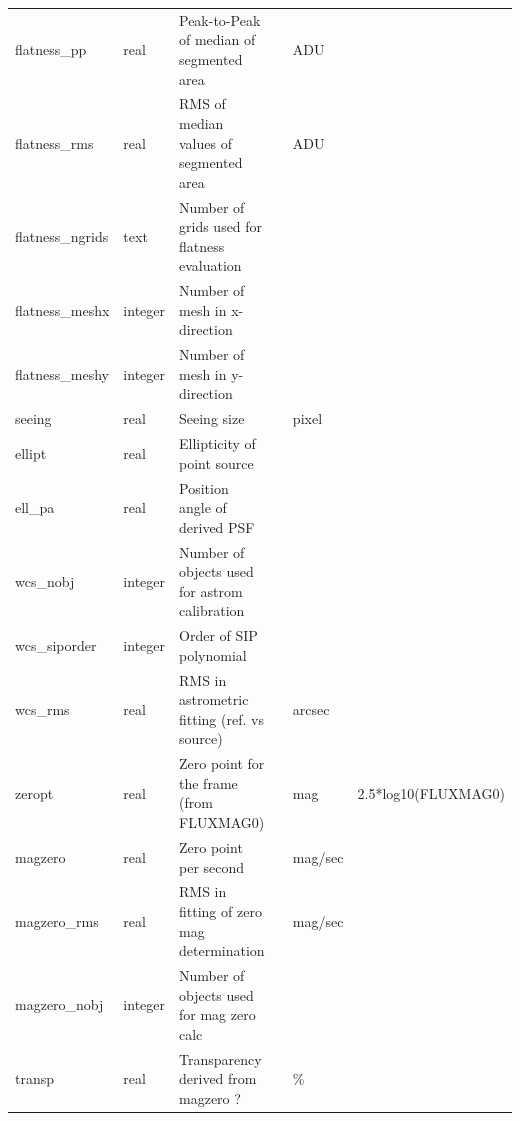 \documentclass[12pt]{article}
\begin{document}
\begin{table}[thbp]
\begin{center}
{\begin{tabular}{llllll}
flatness\_pp & real & Peak-to-Peak of median of segmented area            &                            & ADU         &   \\
flatness\_rms & real & RMS of median values of segmented area              &                            & ADU         &   \\
flatness\_ngrids & text & Number of grids used for flatness evaluation        &                            &             &   \\
flatness\_meshx & integer & Number of mesh in x-direction                       &                            &             &   \\
flatness\_meshy & integer & Number of mesh in y-direction                       &                            &             &   \\
seeing & real & Seeing size                                         &                            & pixel       &   \\
ellipt & real & Ellipticity of point source                         &                            &             &   \\
ell\_pa & real & Position angle of derived PSF                       &                            &             &   \\
wcs\_nobj & integer & Number of objects used for astrom calibration       &                            &             &   \\
wcs\_siporder & integer & Order of SIP polynomial                             &                            &             &   \\
wcs\_rms & real & RMS in astrometric fitting (ref. vs source)         &                            & arcsec      &   \\
zeropt & real & Zero point for the  frame (from FLUXMAG0)           &                            & mag         & 2.5*log10(FLUXMAG0)  \\
magzero & real & Zero point per second                               &                            & mag/sec     &   \\
magzero\_rms & real & RMS in fitting of zero mag determination            &                            & mag/sec     &   \\
magzero\_nobj & integer & Number of objects used for mag zero calc            &                            &             &   \\
transp & real & Transparency derived from magzero ?                 &                            & \%           &   \\

\end{tabular}}
\end{center}
\end{table}
\end{document}
